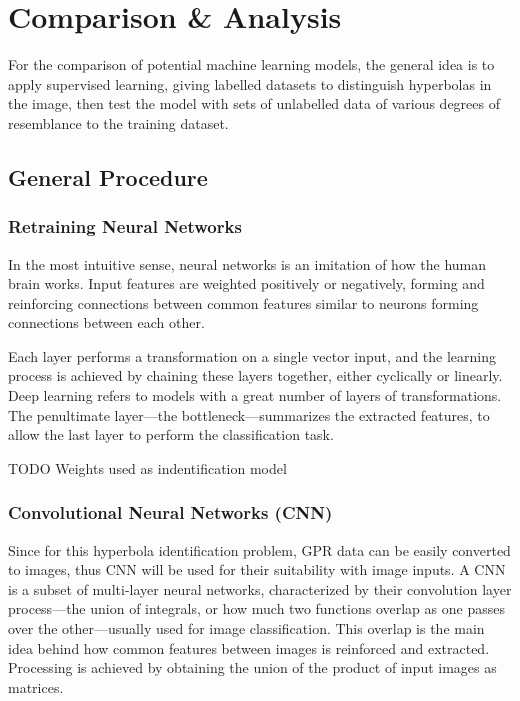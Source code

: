 \documentclass[se,blockletter]{uw-wkrpt}
\begin{document}
\section{Comparison \& Analysis}
For the comparison of potential machine learning models, the general idea is to apply supervised learning, giving labelled datasets to distinguish hyperbolas in the image, then test the model with sets of unlabelled data of various degrees of resemblance to the training dataset.

\subsection{General Procedure}
\subsubsection{Retraining Neural Networks}
In the most intuitive sense, neural networks is an imitation of how the human brain works. Input features are weighted positively or negatively, forming and reinforcing connections between common features similar to neurons forming connections between each other.

Each layer performs a transformation on a single vector input, and the learning process is achieved by chaining these layers together, either cyclically or linearly. Deep learning refers to models with a great number of layers of transformations. The penultimate layer---the bottleneck---summarizes the extracted features, to allow the last layer to perform the classification task. 

TODO Weights used as indentification model

\subsubsection{Convolutional Neural Networks (CNN)}
Since for this hyperbola identification problem, GPR data can be easily converted to images, thus CNN will be used for their suitability with image inputs. A CNN is a subset of multi-layer neural networks, characterized by their convolution layer process---the union of integrals, or how much two functions overlap as one passes over the other---usually used for image classification. This overlap is the main idea behind how common features between images is reinforced and extracted. Processing is achieved by obtaining the union of the product of input images as matrices.
\end{document}
